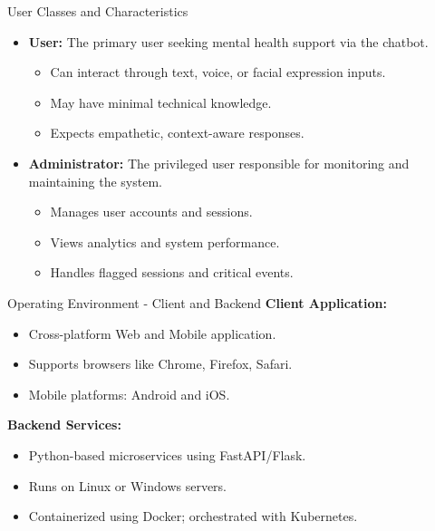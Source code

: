 \documentclass[11pt]{beamer}
\begin{document}
\begin{frame}{User Classes and Characteristics}
\begin{itemize}
    \item \textbf{User:}  
    The primary user seeking mental health support via the chatbot.  
    \begin{itemize}
        \item Can interact through text, voice, or facial expression inputs.
        \item May have minimal technical knowledge.
        \item Expects empathetic, context-aware responses.
    \end{itemize}

    \item \textbf{Administrator:}  
    The privileged user responsible for monitoring and maintaining the system.  
    \begin{itemize}
        \item Manages user accounts and sessions.
        \item Views analytics and system performance.
        \item Handles flagged sessions and critical events.
    \end{itemize}
\end{itemize}
\end{frame}


\begin{frame}{Operating Environment - Client and Backend}
\textbf{Client Application:}
\begin{itemize}
    \item Cross-platform Web and Mobile application.
    \item Supports browsers like Chrome, Firefox, Safari.
    \item Mobile platforms: Android and iOS.
\end{itemize}

\textbf{Backend Services:}
\begin{itemize}
    \item Python-based microservices using FastAPI/Flask.
    \item Runs on Linux or Windows servers.
    \item Containerized using Docker; orchestrated with Kubernetes.
\end{itemize}
\end{frame}
\end{document}

